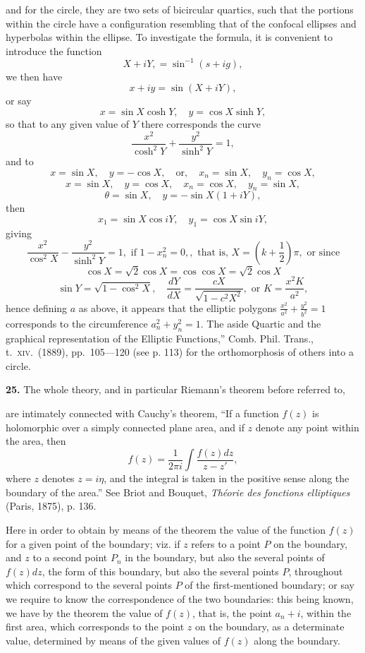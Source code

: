 \documentclass[11pt,a4paper]{article}
\begin{document}
and for the circle, they are two sets of bicircular quartics, such that the portions within the circle have a configuration resembling that of the confocal ellipses and hyperbolas within the ellipse. To investigate the formula, it is convenient to introduce the function
\[
X + iY, = \sin^{-1}(s + ig),
\]
we then have
\[
x + iy = \sin (X + iY),
\]
or say
\[
x = \sin X \cosh Y, \quad y = \cos X \sinh Y,
\]
so that to any given value of $Y$ there corresponds the curve
\[
\frac{x^2}{\cosh^2 Y} + \frac{y^2}{\sinh^2 Y} = 1,
\]
and to
\[
x = \sin X, \quad y = -\cos X, \quad \text{or}, \quad x_n = \sin X, \quad y_n = \cos X,
\]
\[
x = \sin X, \quad y = \cos X, \quad x_n = \cos X, \quad y_n = \sin X,
\]
\[
\theta = \sin X, \quad y = -\sin X (1 + iY),
\]
then
\[
x_1 = \sin X \cos iY, \quad y_1 = \cos X \sin iY,
\]
giving
\[
\frac{x^2}{\cos^2 X} - \frac{y^2}{\sinh^2 Y} = 1, \text{ if } 1 - x_n^2 = 0,, \text{ that is, } X = (k + \frac{1}{2})\pi, \text{ or since}
\]
\[
\cos X = \sqrt{2} \cos X = \cos \cos X = \sqrt{2} \cos X
\]
\[
\sin Y = \sqrt{1 - \cos^2 X}, \quad \frac{dY}{dX} = \frac{c X}{\sqrt{1 - c^2 X^2}}, \text{ or } K = \frac{x^2 K}{a^2},
\]
hence defining $a$ as above, it appears that the elliptic polygons $\frac{x^2}{a^2} + \frac{y^2}{b^2} = 1$ corresponds to the circumference $a_n^2 + y_n^2 = 1$. The aside Quartic and the graphical representation of the Elliptic Functions,'' Comb. Phil. Trans., t.\ \textsc{xiv}.\ (1889), pp.\ 105---120 (see p. 113) for the orthomorphosis of others into a circle.

\textbf{25.} The whole theory, and in particular Riemann's theorem before referred to,

are intimately connected with Cauchy's theorem, ``If a function $f(z)$ is holomorphic over a simply connected plane area, and if $z$ denote any point within the area, then
\[
f(z) = \frac{1}{2\pi i} \int \frac{f(z) dz}{z - z'},
\]
where $z$ denotes $z = i\eta$, and the integral is taken in the positive sense along the boundary of the area.'' See Briot and Bouquet, \textit{Th\'{e}orie des fonctions elliptiques} (Paris, 1875), p. 136.

Here in order to obtain by means of the theorem the value of the function $f(z)$ for a given point of the boundary; viz. if $z$ refers to a point $P$ on the boundary, and $z$ to a second point $P_n$ in the boundary, but also the several points of $f(z) dz$, the form of this boundary, but also the several points $P$, throughout which correspond to the several points $P$ of the first-mentioned boundary; or say we require to know the correspondence of the two boundaries: this being known, we have by the theorem the value of $f(z)$, that is, the point $a_n + i$, within the first area, which corresponds to the point $z$ on the boundary, as a determinate value, determined by means of the given values of $f(z)$ along the boundary.
\end{document}
